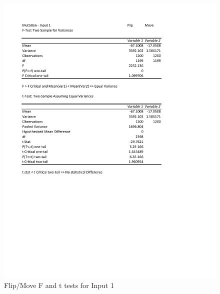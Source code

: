 \documentclass[times]{article}
\begin{document}
	\begin{figure}
		\caption{Flip/Move F and t tests for Input 1}
		\label{fig:mutation1}
		\includegraphics[width=\textwidth]{./t_test/Mutation1}
	\end{figure}
\end{document}
